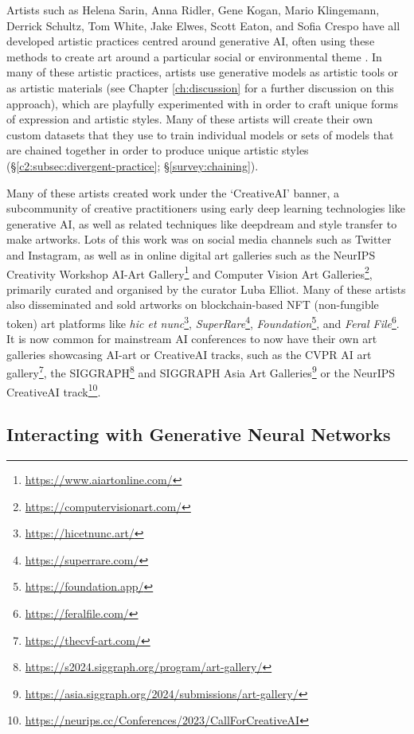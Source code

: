 Artists such as Helena Sarin, Anna Ridler, Gene Kogan, Mario Klingemann, Derrick Schultz, Tom White, Jake Elwes, Scott Eaton, and Sofia Crespo have all developed artistic practices centred around generative AI, often using these methods to create art around a particular social or environmental theme \citep{grba2022deep}. 
In many of these artistic practices, artists use generative models as artistic tools or as artistic materials (see Chapter \ref{ch:discussion} for a further discussion on this approach), which are playfully experimented with in order to craft unique forms of expression and artistic styles.
Many of these artists will create their own custom datasets that they use to train individual models or sets of models that are chained together in order to produce unique artistic styles (\S \ref{c2:subsec:divergent-practice}; \S \ref{survey:chaining}).

Many of these artists created work under the `CreativeAI' banner, a subcommunity of creative practitioners using early deep learning technologies like generative AI, as well as related techniques like deepdream and style transfer \citep{gatys2016neural} to make artworks. 
Lots of this work was on social media channels such as Twitter and Instagram, as well as in online digital art galleries such as the NeurIPS Creativity Workshop AI-Art Gallery\footnote{\url{https://www.aiartonline.com/}} and Computer Vision Art Galleries\footnote{\url{https://computervisionart.com/}}, primarily curated and organised by the curator Luba Elliot. 
Many of these artists also disseminated and sold artworks on blockchain-based NFT (non-fungible token) art platforms like \textit{hic et nunc}\footnote{\url{https://hicetnunc.art/}}, \textit{SuperRare}\footnote{\url{https://superrare.com/}}, \textit{Foundation}\footnote{\url{https://foundation.app/}}, and \textit{Feral File}\footnote{\url{https://feralfile.com/}}. 
It is now common for mainstream AI conferences to now have their own art galleries showcasing AI-art or CreativeAI tracks, such as the CVPR AI art gallery\footnote{\url{https://thecvf-art.com/}}, the SIGGRAPH\footnote{\url{https://s2024.siggraph.org/program/art-gallery/}} and SIGGRAPH Asia Art Galleries\footnote{\url{https://asia.siggraph.org/2024/submissions/art-gallery/}} or the NeurIPS CreativeAI track\footnote{\url{https://neurips.cc/Conferences/2023/CallForCreativeAI}}.

\subsection{Interacting with Generative Neural Networks} 

